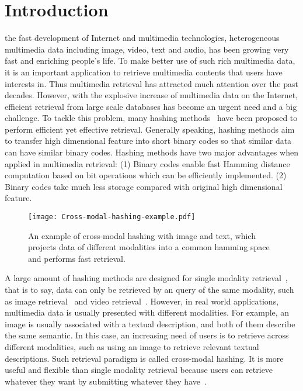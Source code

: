 \documentclass[journal]{IEEEtran}
\begin{document}
\IEEEpeerreviewmaketitle



\section{Introduction}
 the fast development of Internet and multimedia technologies, heterogeneous multimedia data including image, video, text and audio, has been growing very fast and enriching people's life. To make better use of such rich multimedia data, it is an important application to retrieve multimedia contents that users have interests in. Thus multimedia retrieval has attracted much attention over the past decades. However, with the explosive increase of multimedia data on the Internet, efficient retrieval from large scale databases has become an urgent need and a big challenge. To tackle this problem, many hashing methods~\cite{lsh_vldb,agh_icml,imagehashsurvey,llh_cvpr,ninh_cvpr,sdh_cvpr,sh_nips,ssh_cvpr} have been proposed to perform efficient yet effective retrieval. Generally speaking, hashing methods aim to transfer high dimensional feature into short binary codes so that similar data can have similar binary codes. Hashing methods have two major advantages when applied in multimedia retrieval: (1) Binary codes enable fast Hamming distance computation based on bit operations which can be efficiently implemented. (2) Binary codes take much less storage compared with original high dimensional feature. 

\begin{figure}[tb]
	\centering
	\texttt{[image: Cross-modal-hashing-example.pdf]}
	\caption{An example of cross-modal hashing with image and text, which projects data of different modalities into a common hamming space and performs fast retrieval.}
	\label{intro}
\end{figure}

A large amount of hashing methods are designed for single modality retrieval~\cite{lsh_vldb,agh_icml,imagehashsurvey,llh_cvpr,ninh_cvpr,sdh_cvpr,sh_nips,ssh_cvpr}, that is to say, data can only be retrieved by an query of the same modality, such as image retrieval~\cite{imagehashsurvey} and video retrieval~\cite{videohashing}. However, in real world applications, multimedia data is usually presented with different modalities. For example, an image is usually associated with a textual description, and both of them describe the same semantic. In this case, an increasing need of users is to retrieve across different modalities, such as using an image to retrieve relevant textual descriptions. Such retrieval paradigm is called cross-modal hashing. It is more useful and flexible than single modality retrieval because users can retrieve whatever they want by submitting whatever they have~\cite{crossmeidaretrieval_intro}.
\end{document}
